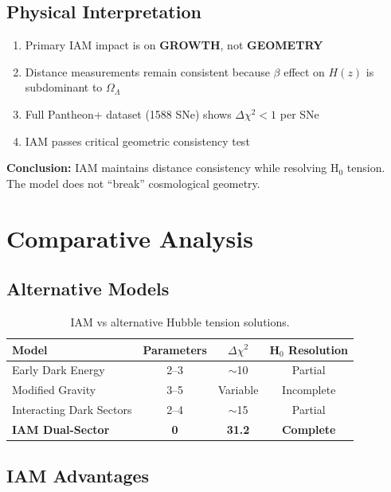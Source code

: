 \documentclass[11pt,letterpaper]{article}
\begin{document}
\subsection{Physical Interpretation}

\begin{enumerate}
\item Primary IAM impact is on \textbf{GROWTH}, not \textbf{GEOMETRY}
\item Distance measurements remain consistent because $\beta$ effect on $H(z)$ is subdominant to $\Omega_\Lambda$
\item Full Pantheon+ dataset (1588 SNe) shows $\Delta\chi^2 < 1$ per SNe
\item IAM passes critical geometric consistency test
\end{enumerate}

\noindent\textbf{Conclusion:} IAM maintains distance consistency while resolving H$_0$ tension. The model does not ``break'' cosmological geometry.

\section{Comparative Analysis}

\subsection{Alternative Models}

\begin{table}[h]
\centering
\begin{tabular}{lccc}
\toprule
Model & Parameters & $\Delta\chi^2$ & H$_0$ Resolution \\
\midrule
Early Dark Energy & 2--3 & $\sim$10 & Partial \\
Modified Gravity & 3--5 & Variable & Incomplete \\
Interacting Dark Sectors & 2--4 & $\sim$15 & Partial \\
\midrule
\textbf{IAM Dual-Sector} & \textbf{0} & \textbf{31.2} & \textbf{Complete} \\
\bottomrule
\end{tabular}
\caption{IAM vs alternative Hubble tension solutions.}
\end{table}

\subsection{IAM Advantages}
\end{document}
